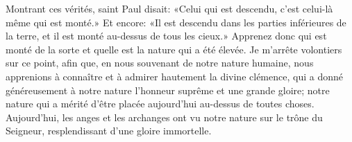 Montrant ces vérités, saint Paul disait:
	«Celui qui est descendu, c’est celui-là même qui est monté.»
Et encore: «Il est descendu dans les parties inférieures de la terre,
	et il est monté au-dessus de tous les cieux.»
Apprenez donc qui est monté de la sorte
	et quelle est la nature qui a été élevée.
Je m’arrête volontiers sur ce point,
	afin que, en nous souvenant de notre nature humaine,
	nous apprenions à connaître et à admirer hautement la divine clémence,
	qui a donné généreusement à notre nature
		l’honneur suprême et une grande gloire;
	notre nature
		qui a mérité d’être placée aujourd’hui au-dessus de toutes choses.
Aujourd’hui,
		les anges et les archanges ont vu notre nature sur le trône du Seigneur,
	resplendissant d’une gloire immortelle.
